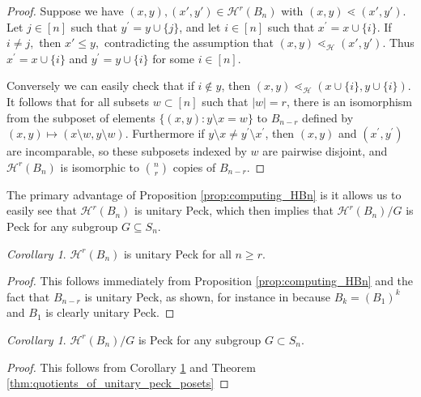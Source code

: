 \documentclass[10 pt]{amsart}
\theoremstyle{plain}
\theoremstyle{definition}
\theoremstyle{remark}
\numberwithin{equation}{section}
\newtheorem{cor}[thm]{Corollary}
\theoremstyle{remark}
\begin{document}
\begin{proof}

Suppose we have $(x, y),(x', y') \in \mathcal H^r(B_n)$ with $(x, y) \lessdot (x', y').$ Let $j\in [n]$ such that $y^\prime = y\cup\{j\}$, and let $i\in [n]$ such that $x^\prime = x\cup \{i\}$. If $i \ne j,$ then $x' \leq y,$ contradicting the assumption that $(x, y) \lessdot_{\mathcal H} (x', y').$ Thus $x^\prime = x\cup\{i\}$ and $y^\prime = y\cup\{i\}$ for some $i\in [n]$.

Conversely we can easily check that if $i\not\in y$, then $(x, y)\lessdot_{\mathcal{H}} (x\cup\{i\}, y\cup\{i\})$.  It follows that for all subsets $w\subset [n]$ such that $|w| = r$, there is an isomorphism from the subposet of elements $\{(x, y)\colon y\setminus x = w\}$ to $B_{n-r}$ defined by $(x,y)\mapsto (x\setminus w,y\setminus w)$.  Furthermore if $y\setminus x \ne y^\prime \setminus x^\prime$, then $(x, y)$ and $(x^\prime, y^\prime)$ are incomparable, so these subposets indexed by $w$ are pairwise disjoint, and $\mathcal{H}^r(B_n)$ is isomorphic to $\binom{n}{r}$ copies of $B_{n-r}$.
\end{proof}



The primary advantage of Proposition \ref{prop:computing_HBn} is it allows us to easily see that $\mathcal{H}^r(B_n)$ is unitary Peck, which then implies that $\mathcal{H}^r(B_n)/G$ is Peck for any subgroup $G\subseteq S_n$.


\begin{cor}\label{cor:HBn_unitary_peck}
$\mathcal{H}^r(B_n)$ is unitary Peck for all $n\ge r$.
\end{cor}

\begin{proof}
This follows immediately from Proposition \ref{prop:computing_HBn} and the fact that $B_{n-r}$ is unitary Peck, as shown, for instance in \cite[Theorem 2a]{quotients_stanley} because $B_k = (B_1)^k$ and $B_1$ is clearly unitary Peck.
\end{proof}

\begin{cor}\label{cor:quotients_of_HBn_peck}
$\mathcal{H}^r(B_n)/G$ is Peck for any subgroup $G\subset S_n$.
\end{cor}

\begin{proof}
This follows from Corollary \ref{cor:HBn_unitary_peck} and Theorem \ref{thm:quotients_of_unitary_peck_posets}
\end{proof}
\end{document}
